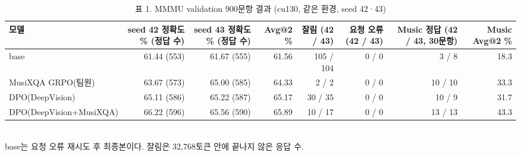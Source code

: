 \begin{table}[t]
\centering
\small
\caption{표 1. MMMU validation 900문항 결과 (cu130, 같은 환경, seed 42·43)}
\label{tab:table1_main_cu130}
\begin{tabular}{lrrrrrrr}
\toprule
모델 & seed 42 정확도 \% (정답 수) & seed 43 정확도 \% (정답 수) & Avg@2 \% & 잘림 (42 / 43) & 요청 오류 (42 / 43) & Music 정답 (42 / 43, 30문항) & Music Avg@2 \% \\
\midrule
base & 61.44 (553) & 61.67 (555) & 61.56 & 105 / 104 & 0 / 0 & 3 / 8 & 18.3 \\
MusiXQA GRPO(팀원) & 63.67 (573) & 65.00 (585) & 64.33 & 2 / 2 & 0 / 0 & 10 / 10 & 33.3 \\
DPO(DeepVision) & 65.11 (586) & 65.22 (587) & 65.17 & 30 / 35 & 0 / 0 & 10 / 9 & 31.7 \\
DPO(DeepVision+MusiXQA) & 66.22 (596) & 65.56 (590) & 65.89 & 10 / 17 & 0 / 0 & 13 / 13 & 43.3 \\
\bottomrule
\end{tabular}
\\[2pt]{\footnotesize base는 요청 오류 재시도 후 최종본이다. 잘림은 32,768토큰 안에 끝나지 않은 응답 수.}
\end{table}
